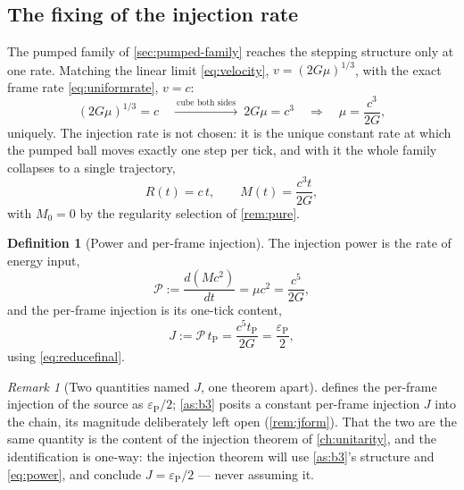 \documentclass[11pt]{amsbook}
\theoremstyle{plain}
\theoremstyle{definition}
\newtheorem{definition}[theorem]{Definition}
\theoremstyle{remark}
\newtheorem{remark}[theorem]{Remark}
\begin{document}
\subsection{The fixing of the injection rate}

The pumped family of \cref{sec:pumped-family} reaches the stepping structure only at one rate. Matching the linear limit \cref{eq:velocity}, $v = (2G\mu)^{1/3}$, with the exact frame rate \cref{eq:uniformrate}, $v = c$:
\begin{equation}\label{eq:pinning}
(2G\mu)^{1/3} = c \quad\xrightarrow{\ \text{cube both sides}\ }\ 2G\mu = c^{3} \quad\Longrightarrow\quad \mu = \frac{c^{3}}{2G},
\end{equation}
uniquely. The injection rate is not chosen: it is the unique constant rate at which the pumped ball moves exactly one step per tick, and with it the whole family collapses to a single trajectory,
\begin{equation}\label{eq:ct}
R(t) = c\,t, \qquad M(t) = \frac{c^{3} t}{2G},
\end{equation}
with $M_{0} = 0$ by the regularity selection of \cref{rem:pure}.

\begin{definition}[Power and per-frame injection]\label{def:power}
The injection power is the rate of energy input,
\begin{equation}\label{eq:power}
\mathcal P := \frac{d(Mc^{2})}{dt} = \mu c^{2} = \frac{c^{5}}{2G},
\end{equation}
and the per-frame injection is its one-tick content,
\begin{equation}\label{eq:jtick}
J := \mathcal P\, t_{\mathrm P} = \frac{c^{5} t_{\mathrm P}}{2G} = \frac{\varepsilon_{\mathrm P}}{2},
\end{equation}
using \cref{eq:reducefinal}.
\end{definition}

\begin{remark}[Two quantities named $J$, one theorem apart]\label{rem:tworeadings-j}
 defines the per-frame injection of the source as $\varepsilon_{\mathrm P}/2$; \cref{as:b3} posits a constant per-frame injection $J$ into the chain, its magnitude deliberately left open (\cref{rem:jform}). That the two are the same quantity is the content of the injection theorem of \cref{ch:unitarity}, and the identification is one-way: the injection theorem will use \cref{as:b3}'s structure and \cref{eq:power}, and conclude $J = \varepsilon_{\mathrm P}/2$ --- never assuming it.
\end{remark}
\end{document}
